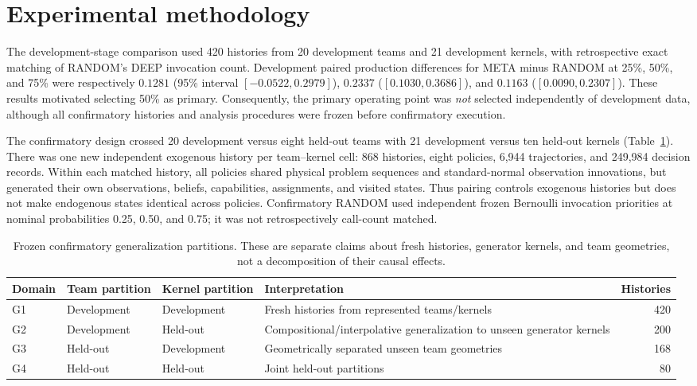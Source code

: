 \documentclass[11pt]{article}
\begin{document}
\section{Experimental methodology}
The development-stage comparison used 420 histories from 20 development teams and 21 development kernels, with retrospective exact matching of RANDOM's DEEP invocation count. Development paired production differences for META minus RANDOM at 25\%, 50\%, and 75\% were respectively $0.1281$ (95\% interval $[-0.0522,0.2979]$), $0.2337$ ($[0.1030,0.3686]$), and $0.1163$ ($[0.0090,0.2307]$). These results motivated selecting 50\% as primary. Consequently, the primary operating point was \emph{not} selected independently of development data, although all confirmatory histories and analysis procedures were frozen before confirmatory execution.

The confirmatory design crossed 20 development versus eight held-out teams with 21 development versus ten held-out kernels (Table~\ref{tab:domains}). There was one new independent exogenous history per team--kernel cell: 868 histories, eight policies, 6,944 trajectories, and 249,984 decision records. Within each matched history, all policies shared physical problem sequences and standard-normal observation innovations, but generated their own observations, beliefs, capabilities, assignments, and visited states. Thus pairing controls exogenous histories but does not make endogenous states identical across policies. Confirmatory RANDOM used independent frozen Bernoulli invocation priorities at nominal probabilities 0.25, 0.50, and 0.75; it was not retrospectively call-count matched.

\begin{table}[ht]\centering\small\caption{Frozen confirmatory generalization partitions. These are separate claims about fresh histories, generator kernels, and team geometries, not a decomposition of their causal effects.}\label{tab:domains}\begin{tabularx}{\linewidth}{l l l X r}\toprule Domain & Team partition & Kernel partition & Interpretation & Histories\\\midrule G1 & Development & Development & Fresh histories from represented teams/kernels & 420\\ G2 & Development & Held-out & Compositional/interpolative generalization to unseen generator kernels & 200\\ G3 & Held-out & Development & Geometrically separated unseen team geometries & 168\\ G4 & Held-out & Held-out & Joint held-out partitions & 80\\\bottomrule\end{tabularx}\end{table}
\end{document}
